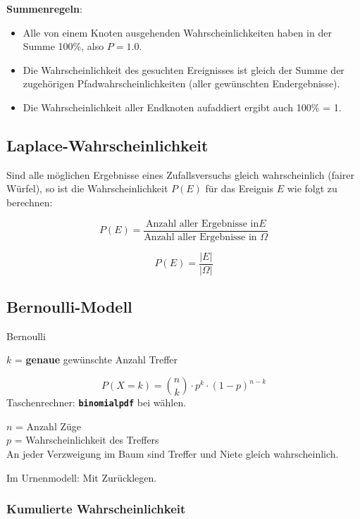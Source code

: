 \begin{multicols}{2}
\textbf{Summenregeln}:
\begin{itemize}
\item Alle von einem Knoten ausgehenden Wahrscheinlichkeiten haben in
der Summe 100\%, also $P=1.0$.
\item Die Wahrscheinlichkeit des gesuchten Ereignisses ist gleich der
Summe der zugehörigen Pfadwahrscheinlichkeiten (aller gewünschten
Endergebnisse).
\item Die Wahrscheinlichkeit aller Endknoten aufaddiert ergibt auch
100\% = 1.
\end{itemize}




\subsection*{Laplace-Wahrscheinlichkeit}
Sind alle möglichen Ergebnisse eines Zufallsversuchs gleich
wahrscheinlich (fairer Würfel), so ist die Wahrscheinlichkeit $P(E)$ für das Ereignis
$E$ wie folgt zu berechnen:

$$P(E) = \frac{\textrm{Anzahl aller Ergebnisse in
}E}{\textrm{Anzahl aller Ergebnisse in }\Omega}$$


\begin{gesetz*}{}{}
$$P(E) = \frac{|E|}{|\Omega|}$$
\end{gesetz*}



\subsection*{Bernoulli-Modell}
\begin{gesetz*}{Bernoulli}{}

$k$ = \textbf{genaue} gewünschte Anzahl Treffer

$$P(X=k) = {n \choose k}\cdot{}p^k\cdot{}(1-p)^{n-k}$$
Taschenrechner:  \textbf{\texttt{binomialpdf}} bei
 wählen.

$n$ = Anzahl Züge\\
$p$ = Wahrscheinlichkeit des Treffers\\

An jeder Verzweigung im Baum sind Treffer und Niete gleich
wahrscheinlich.

Im Urnenmodell: Mit Zurücklegen.
\end{gesetz*}

\subsubsection*{Kumulierte Wahrscheinlichkeit}


\end{multicols}
